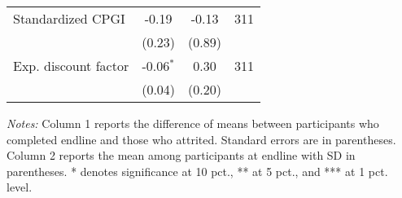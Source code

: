 \begin{table}[h]
{\begin{threeparttable}
\begin{tabular}{l*{3}{c}}
Standardized CPGI&    -0.19&    -0.13&      311\\
          &   (0.23)&   (0.89)&         \\
Exp. discount factor&-0.06$^{*}$&     0.30&      311\\
          &   (0.04)&   (0.20)&         \\
\bottomrule \end{tabular} \begin{tablenotes}[flushleft] \footnotesize \item \emph{Notes:} Column 1 reports the difference of means between participants who completed endline and those who attrited. Standard errors are in parentheses. Column 2 reports the mean among participants at endline with SD in parentheses. * denotes significance at 10 pct., ** at 5 pct., and *** at 1 pct. level. \end{tablenotes} \end{threeparttable} } \end{table}

